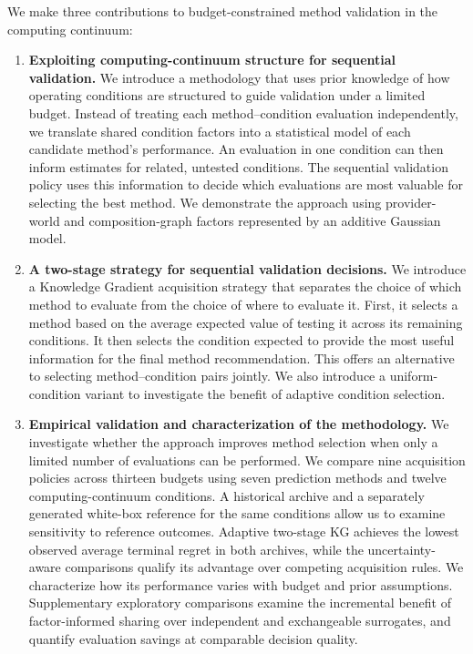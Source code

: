 \documentclass[10pt,a4paper]{article}
\begin{document}
We make three contributions to budget-constrained method validation in the computing continuum:
\begin{enumerate}
\item \textbf{Exploiting computing-continuum structure for sequential validation.} We introduce a methodology that uses prior knowledge of how operating conditions are structured to guide validation under a limited budget. Instead of treating each method--condition evaluation independently, we translate shared condition factors into a statistical model of each candidate method's performance. An evaluation in one condition can then inform estimates for related, untested conditions. The sequential validation policy uses this information to decide which evaluations are most valuable for selecting the best method. We demonstrate the approach using provider-world and composition-graph factors represented by an additive Gaussian model.
\item \textbf{A two-stage strategy for sequential validation decisions.} We introduce a Knowledge Gradient acquisition strategy that separates the choice of which method to evaluate from the choice of where to evaluate it. First, it selects a method based on the average expected value of testing it across its remaining conditions. It then selects the condition expected to provide the most useful information for the final method recommendation. This offers an alternative to selecting method--condition pairs jointly. We also introduce a uniform-condition variant to investigate the benefit of adaptive condition selection.
\item \textbf{Empirical validation and characterization of the methodology.} We investigate whether the approach improves method selection when only a limited number of evaluations can be performed. We compare nine acquisition policies across thirteen budgets using seven prediction methods and twelve computing-continuum conditions. A historical archive and a separately generated white-box reference for the same conditions allow us to examine sensitivity to reference outcomes. Adaptive two-stage KG achieves the lowest observed average terminal regret in both archives, while the uncertainty-aware comparisons qualify its advantage over competing acquisition rules. We characterize how its performance varies with budget and prior assumptions. Supplementary exploratory comparisons examine the incremental benefit of factor-informed sharing over independent and exchangeable surrogates, and quantify evaluation savings at comparable decision quality.
\end{enumerate}
\end{document}
